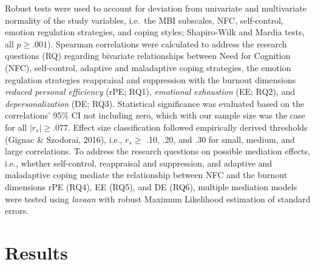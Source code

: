\documentclass[
  man]{apa6}
\begin{document}
Robust tests were used to account for deviation from univariate and multivariate normality of the study variables, i.e.~the MBI subscales, NFC, self-control, emotion regulation strategies, and coping styles; Shapiro-Wilk and Mardia tests, all \(p\ge.001\)). Spearman correlations were calculated to address the research questions (RQ) regarding bivariate relationships between Need for Cognition (NFC), self-control, adaptive and maladaptive coping strategies, the emotion regulation strategies reappraisal and suppression with the burnout dimensions \emph{reduced personal efficiency} (rPE; RQ1), \emph{emotional exhaustion} (EE; RQ2), and \emph{depersonalization} (DE; RQ3). Statistical significance was evaluated based on the correlations' 95\% CI not including zero, which with our sample size was the case for all \(|r_{s}|\ge.077\). Effect size classification followed empirically derived thresholds (Gignac \& Szodorai, 2016), i.e., \(r_{s} \ge\) .10, .20, and .30 for small, medium, and large correlations. To address the research questions on possible mediation effects, i.e., whether self-control, reappraisal and suppression, and adaptive and maladaptive coping mediate the relationship between NFC and the burnout dimensions rPE (RQ4), EE (RQ5), and DE (RQ6), multiple mediation models were tested using \emph{lavaan} with robust Maximum Likelihood estimation of standard errors.

\section{Results}\label{results}
\end{document}
